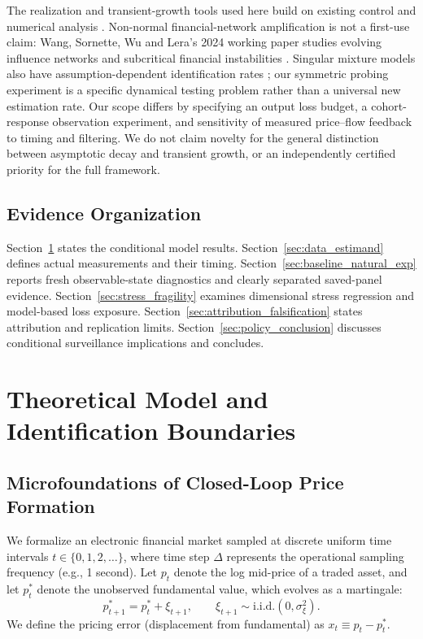 \documentclass[12pt]{article}
\theoremstyle{definition}
\theoremstyle{remark}
\begin{document}
The realization and transient-growth tools used here build on existing control and numerical analysis \citep{gilbert1963,kreiss1962,spijker1991,trefethen2005spectra}. Non-normal financial-network amplification is not a first-use claim: Wang, Sornette, Wu and Lera's 2024 working paper studies evolving influence networks and subcritical financial instabilities \citep{wang2024}. Singular mixture models also have assumption-dependent identification rates \citep{manole2022}; our symmetric probing experiment is a specific dynamical testing problem rather than a universal new estimation rate. Our scope differs by specifying an output loss budget, a cohort-response observation experiment, and sensitivity of measured price--flow feedback to timing and filtering. We do not claim novelty for the general distinction between asymptotic decay and transient growth, or an independently certified priority for the full framework.

\subsection{Evidence Organization}
Section~\ref{sec:model} states the conditional model results. Section~\ref{sec:data_estimand} defines actual measurements and their timing. Section~\ref{sec:baseline_natural_exp} reports fresh observable-state diagnostics and clearly separated saved-panel evidence. Section~\ref{sec:stress_fragility} examines dimensional stress regression and model-based loss exposure. Section~\ref{sec:attribution_falsification} states attribution and replication limits. Section~\ref{sec:policy_conclusion} discusses conditional surveillance implications and concludes.

\section{Theoretical Model and Identification Boundaries}
\label{sec:model}

\subsection{Microfoundations of Closed-Loop Price Formation}
We formalize an electronic financial market sampled at discrete uniform time intervals $t \in \{0, 1, 2, \dots\}$, where time step $\Delta$ represents the operational sampling frequency (e.g., 1 second). Let $p_t$ denote the log mid-price of a traded asset, and let $p_t^*$ denote the unobserved fundamental value, which evolves as a martingale:
\begin{equation}
p_{t+1}^* = p_t^* + \xi_{t+1}, \qquad \xi_{t+1} \sim \text{i.i.d.}(0, \sigma_\xi^2).
\label{eq:fundamental_process}
\end{equation}
We define the pricing error (displacement from fundamental) as $x_t \equiv p_t - p_t^*$.
\end{document}
